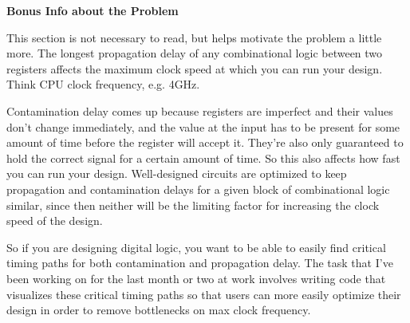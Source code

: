 \documentclass[12pt]{article}
\begin{document}
\bigbreak
\bigbreak
\bigbreak
\bigbreak
\bigbreak

\textbf{Bonus Info about the Problem}

This section is not necessary to read, but helps motivate the problem a little more.
The longest propagation delay of any combinational logic between two registers affects the maximum clock speed at which you can run your design.
Think CPU clock frequency, e.g. 4GHz.

Contamination delay comes up because registers are imperfect and their values don't change immediately, and the value at the input has to be present for some amount of time before the register will accept it.
They're also only guaranteed to hold the correct signal for a certain amount of time.
So this also affects how fast you can run your design.
Well-designed circuits are optimized to keep propagation and contamination delays for a given block of combinational logic similar, since then neither will be the limiting factor for increasing the clock speed of the design.

So if you are designing digital logic, you want to be able to easily find critical timing paths for both contamination and propagation delay.
The task that I've been working on for the last month or two at work involves writing code that visualizes these critical timing paths so that users can more easily optimize their design in order to remove bottlenecks on max clock frequency.
\end{document}
